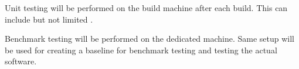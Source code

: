 Unit testing will be performed on the build machine after each build. This can include but not limited .

Benchmark testing will be performed on the dedicated machine. Same setup will be used for creating a baseline for benchmark testing and testing the actual software. 
